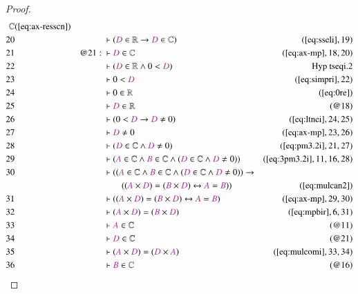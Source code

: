 \begin{proof}
\begin{align}
      \mathbb{C}&(\mbox{\ref{eq:ax-resscn}})\notag
  \\ 20 &&  & \vdash ( \mc{D} \in \mathbb{R} \rightarrow \mc{D} \in \mathbb{C}
      )&(\mbox{\ref{eq:sseli}},19)\notag
  \\ 21 && @21:\  & \vdash \mc{D} \in
      \mathbb{C}&(\mbox{\ref{eq:ax-mp}},18,20)\notag
  \\ 22 &&  & \vdash ( \mc{D} \in \mathbb{R} \wedge 0 < \mc{D}
      )&\text{Hyp~tseqi.2}\notag%
  \\ 23 &&  & \vdash 0 < \mc{D}&(\mbox{\ref{eq:simpri}},22)\notag
  \\ 24 &&  & \vdash 0 \in \mathbb{R}&(\mbox{\ref{eq:0re}})\notag
  \\ 25 &&  & \vdash \mc{D} \in \mathbb{R}&(@18)\notag
  \\ 26 &&  & \vdash ( 0 < \mc{D} \rightarrow \mc{D} \ne 0
      )&(\mbox{\ref{eq:ltnei}},24,25)\notag
  \\ 27 &&  & \vdash \mc{D} \ne 0&(\mbox{\ref{eq:ax-mp}},23,26)\notag
  \\ 28 &&  & \vdash ( \mc{D} \in \mathbb{C} \wedge \mc{D} \ne 0
      )&(\mbox{\ref{eq:pm3.2i}},21,27)\notag
  \\ 29 &&  & \vdash ( \mc{A} \in \mathbb{C} \wedge \mc{B} \in \mathbb{C}
      \wedge ( \mc{D} \in \mathbb{C} \wedge \mc{D} \ne 0 )
      )&(\mbox{\ref{eq:3pm3.2i}},11,16,28)\notag
  \\ 30 &&  & \vdash ( ( \mc{A} \in \mathbb{C} \wedge \mc{B} \in \mathbb{C}
      \wedge ( \mc{D} \in \mathbb{C} \wedge \mc{D} \ne 0 )
      ) \rightarrow  \notag \\ & & & \qquad
     ( ( \mc{A} \times \mc{D} ) = ( \mc{B}
      \times \mc{D} ) \leftrightarrow \mc{A} = \mc{B} )
      )&(\mbox{\ref{eq:mulcan2}})\notag
  \\ 31 &&  & \vdash ( ( \mc{A} \times \mc{D} ) = ( \mc{B} \times \mc{D} )
      \leftrightarrow \mc{A} = \mc{B}
      )&(\mbox{\ref{eq:ax-mp}},29,30)\notag
  \\ 32 &&  & \vdash ( \mc{A} \times \mc{D} ) = ( \mc{B} \times \mc{D}
      )&(\mbox{\ref{eq:mpbir}},6,31)\notag
  \\ 33 &&  & \vdash \mc{A} \in \mathbb{C}&(@11)\notag
  \\ 34 &&  & \vdash \mc{D} \in \mathbb{C}&(@21)\notag
  \\ 35 &&  & \vdash ( \mc{A} \times \mc{D} ) = ( \mc{D} \times \mc{A}
      )&(\mbox{\ref{eq:mulcomi}},33,34)\notag
  \\ 36 &&  & \vdash \mc{B} \in \mathbb{C}&(@16)\notag

\end{align}
\end{proof}
